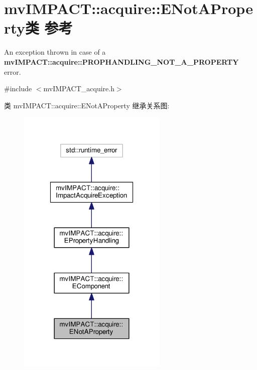 \hypertarget{classmv_i_m_p_a_c_t_1_1acquire_1_1_e_not_a_property}{\section{mv\+I\+M\+P\+A\+C\+T\+:\+:acquire\+:\+:E\+Not\+A\+Property类 参考}
\label{classmv_i_m_p_a_c_t_1_1acquire_1_1_e_not_a_property}
}


An exception thrown in case of a {\bfseries mv\+I\+M\+P\+A\+C\+T\+::acquire\+::\+P\+R\+O\+P\+H\+A\+N\+D\+L\+I\+N\+G\+\_\+\+N\+O\+T\+\_\+\+A\+\_\+\+P\+R\+O\+P\+E\+R\+T\+Y} error.  




{\ttfamily \#include $<$mv\+I\+M\+P\+A\+C\+T\+\_\+acquire.\+h$>$}



类 mv\+I\+M\+P\+A\+C\+T\+:\+:acquire\+:\+:E\+Not\+A\+Property 继承关系图\+:
\nopagebreak
\begin{figure}[H]
\begin{center}
\leavevmode
\includegraphics[width=202pt]{classmv_i_m_p_a_c_t_1_1acquire_1_1_e_not_a_property__inherit__graph}
\end{center}
\end{figure}


